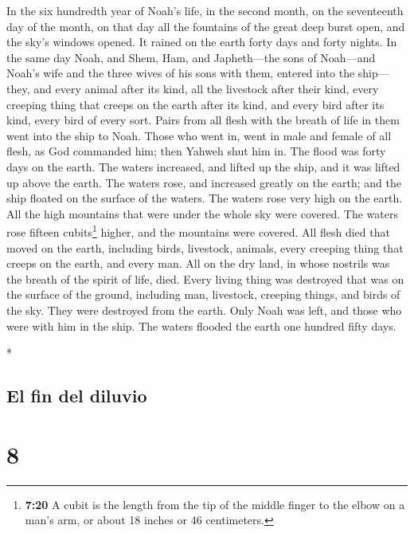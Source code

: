 \begin{paracol}{2}
\begin{otherlanguage}{english}
 In the six hundredth year of Noah's life, in the second
month, on the seventeenth day of the month, on that day all the
fountains of the great deep burst open, and the sky's windows opened.
 It rained on the earth forty days and forty nights.
 In the same day Noah, and Shem, Ham, and Japheth---the
sons of Noah---and Noah's wife and the three wives of his sons with
them, entered into the ship---  they, and every animal
after its kind, all the livestock after their kind, every creeping thing
that creeps on the earth after its kind, and every bird after its kind,
every bird of every sort.  Pairs from all flesh with the
breath of life in them went into the ship to Noah.  Those
who went in, went in male and female of all flesh, as God commanded him;
then Yahweh shut him in.  The flood was forty days on the
earth. The waters increased, and lifted up the ship, and it was lifted
up above the earth.  The waters rose, and increased
greatly on the earth; and the ship floated on the surface of the waters.
 The waters rose very high on the earth. All the high
mountains that were under the whole sky were covered. 
The waters rose fifteen cubits\footnote{\textbf{7:20} A cubit is the
  length from the tip of the middle finger to the elbow on a man's arm,
  or about 18 inches or 46 centimeters.} higher, and the mountains were
covered.  All flesh died that moved on the earth,
including birds, livestock, animals, every creeping thing that creeps on
the earth, and every man.  All on the dry land, in whose
nostrils was the breath of the spirit of life, died. 
Every living thing was destroyed that was on the surface of the ground,
including man, livestock, creeping things, and birds of the sky. They
were destroyed from the earth. Only Noah was left, and those who were
with him in the ship.  The waters flooded the earth one
hundred fifty days.

\end{otherlanguage}

\switchcolumn[0]*

\hypertarget{el-fin-del-diluvio}{%
\subsection{El fin del diluvio}\label{el-fin-del-diluvio}}

\hypertarget{section-14}{%
\section{8}\label{section-14}}


\end{paracol}
